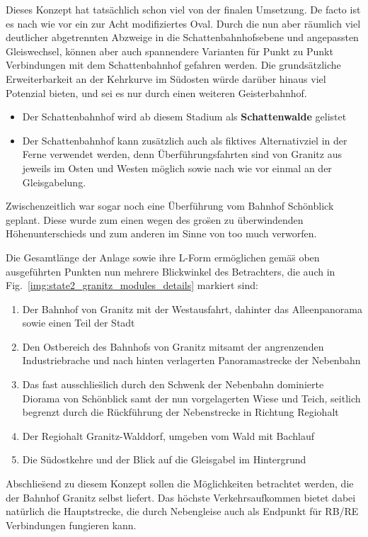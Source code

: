 Dieses Konzept hat tats\"achlich schon viel von der finalen Umsetzung.
De facto ist es nach wie vor ein zur Acht modifiziertes Oval.
Durch die nun aber r\"aumlich viel deutlicher abgetrennten Abzweige in die Schattenbahnhofsebene und angepassten Gleiswechsel, k\"onnen aber auch spannendere Varianten f\"ur Punkt zu Punkt Verbindungen mit dem Schattenbahnhof gefahren werden.
Die grunds\"atzliche Erweiterbarkeit an der Kehrkurve im S\"udosten w\"urde dar\"uber hinaus viel Potenzial bieten, und sei es nur durch einen weiteren Geisterbahnhof.
\begin{itemize}
	\item Der Schattenbahnhof wird ab diesem Stadium als \textbf{Schattenwalde} gelistet
	\item Der Schattenbahnhof kann zus\"atzlich auch als fiktives Alternativziel in der Ferne verwendet werden, denn \"Uberf\"uhrungsfahrten sind von Granitz aus jeweils im Osten und Westen m\"oglich sowie nach wie vor einmal an der Gleisgabelung.
\end{itemize}
Zwischenzeitlich war sogar noch eine \"Uberf\"uhrung vom Bahnhof Sch\"onblick geplant.
Diese wurde zum einen wegen des gro\"sen zu \"uberwindenden H\"ohenunterschieds und zum anderen im Sinne von too much verworfen.

Die Gesamtl\"ange der Anlage sowie ihre L-Form erm\"oglichen gem\"a\"s oben ausgef\"uhrten Punkten nun mehrere Blickwinkel des Betrachters, die auch in Fig.~\ref{img:state2_granitz_modules_details} markiert sind:
\begin{enumerate}
	\item Der Bahnhof von Granitz mit der Westausfahrt, dahinter das Alleenpanorama sowie einen Teil der Stadt
	\item Den Ostbereich des Bahnhofs von Granitz mitsamt der angrenzenden Industriebrache und nach hinten verlagerten Panoramastrecke der Nebenbahn
	\item Das fast ausschlie\"slich durch den Schwenk der Nebenbahn dominierte Diorama von Sch\"onblick samt der nun vorgelagerten Wiese und Teich, seitlich begrenzt durch die R\"uckf\"uhrung der Nebenstrecke in Richtung Regiohalt
	\item Der Regiohalt Granitz-Walddorf, umgeben vom Wald mit Bachlauf
	\item Die S\"udostkehre und der Blick auf die Gleisgabel im Hintergrund
\end{enumerate}

Abschlie\"send zu diesem Konzept sollen die M\"oglichkeiten betrachtet werden, die der Bahnhof Granitz selbst liefert.
Das h\"ochste Verkehrsaufkommen bietet dabei nat\"urlich die Hauptstrecke, die durch Nebengleise auch als Endpunkt f\"ur RB/RE Verbindungen fungieren kann.

